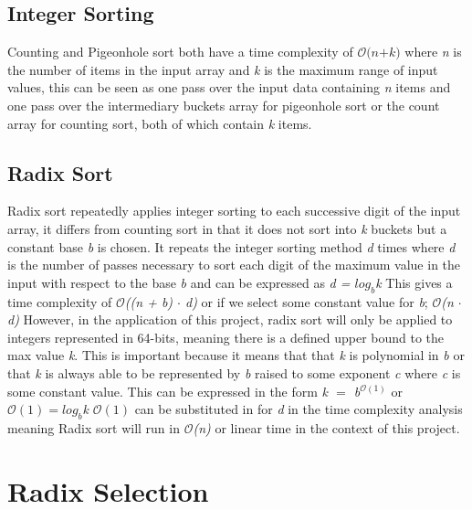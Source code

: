 \documentclass[12pt]{article}
\begin{document}
	\subsection{Integer Sorting}
	Counting and Pigeonhole sort both have a time complexity of $\mathcal{O}\textit{(n+k)}$ where \textit{n} is the number of items in the input array and \textit{k} is the maximum range of input values, this can be seen as one pass over the input data containing \textit{n} items and one pass over the intermediary buckets array for pigeonhole sort or the count array for counting sort, both of which contain \textit{k} items.
	\newline
	\subsection{Radix Sort}
	Radix sort repeatedly applies integer sorting to each successive digit of the input array, it differs from counting sort in that it does not sort into \textit{k} buckets but a constant base \textit{b} is chosen. It repeats the integer sorting method \textit{d} times where \textit{d} is the number of passes necessary to sort each digit of the maximum value in the input with respect to the base \textit{b} and can be expressed as \textit{d = $log_b$k}
	\newline
	This gives a time complexity of	$\mathcal{O}$\textit{((n + b) $\cdot$ d)} or if we select some constant value for \textit{b}; $\mathcal{O}$\textit{(n $\cdot$ d)}
	\newline However, in the application of this project, radix sort will only be applied to integers represented in 64-bits, meaning there is a defined upper bound to the max value \textit{k}. This is important because it means that that \textit{k} is polynomial in \textit{b} or that \textit{k} is always able to be represented by \textit{b} raised to some exponent \textit{c} where \textit{c} is some constant value. This can be expressed in the form \textit{k $=$ b$^{\mathcal{O}(1)}$} or \textit{$\mathcal{O}(1) = log_b$k}
	\newline
	\textit{$\mathcal{O}(1)$} can be substituted in for \textit{d} in the time complexity analysis meaning Radix sort will run in $\mathcal{O}$\textit{(n)} or linear time in the context of this project.
	\pagebreak
	\section{Radix Selection}
\end{document}
